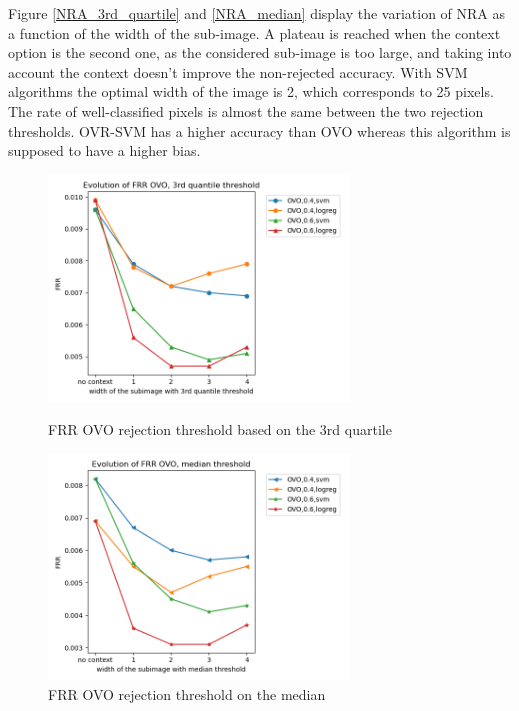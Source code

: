 \documentclass{siamart171218}
\begin{document}
Figure \ref{NRA_3rd_quartile} and \ref{NRA_median} display the variation of NRA as a function of the width of the sub-image. A plateau is reached when the context option is the second one, as the considered sub-image is too large, and taking into account the context doesn't improve the non-rejected accuracy. With SVM algorithms the optimal width of the image is 2, which corresponds to 25 pixels. The rate of well-classified pixels is almost the same between the two rejection thresholds. OVR-SVM has a higher accuracy than OVO whereas this algorithm is supposed to have a higher bias. \\
\begin{figure}[h!]
    \begin{minipage}[c]{.46\linewidth}
        \centering
        \includegraphics[width=8cm]{images/FRR_OVO_quartile.png}
        \caption{FRR OVO rejection threshold based on the 3rd quartile}
        \label{FRR_3rd_quartile}
    \end{minipage}
    \hfill
    \begin{minipage}[c]{.46\linewidth}
        \centering
        \includegraphics[width=8cm]{images/FRR_OVO_median.png}
        \caption{FRR OVO rejection threshold on the median}
        \label{FRR_median}
    \end{minipage}
    \hfill
\end{figure}
\end{document}
